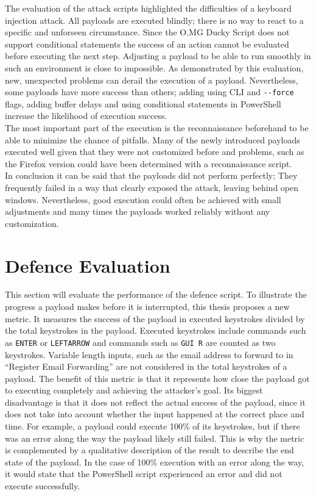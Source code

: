 The evaluation of the attack scripts highlighted the difficulties of a keyboard injection attack. All payloads are executed blindly; there is no way to react to a specific and unforseen circumstance. Since the O.MG Ducky Script does not support conditional statements the success of an action cannot be evaluated before executing the next step. Adjusting a payload to be able to run smoothly in such an environment is close to impossible. As demonstrated by this evaluation, new, unexpected problems can derail the execution of a payload. Nevertheless, some payloads have more success than others; adding using CLI and \verb|--force| flags, adding buffer delays and using conditional statements in PowerShell increase the likelihood of execution success. \\
The most important part of the execution is the reconnaissance beforehand to be able to minimize the chance of pitfalls. Many of the newly introduced payloads executed well given that they were not customized before and problems, such as the Firefox version could have been determined with a reconnaissance script. \\
In conclusion it can be said that the payloads did not perform perfectly; They frequently failed in a way that clearly exposed the attack, leaving behind open windows. Nevertheless, good execution could often be achieved with small adjustments and many times the payloads worked reliably without any customization. 




\section{Defence Evaluation} \label{defence evaluation}


This section will evaluate the performance of the defence script. To illustrate the progress a payload makes before it is interrupted, this thesis proposes a new metric. It measures the success of the payload in executed keystrokes divided by the total keystrokes in the payload. Executed keystrokes include commands such as \verb|ENTER| or \verb|LEFTARROW| and commands such as \verb|GUI R| are counted as two keystrokes. Variable length inputs, such as the email address to forward to in ``Register Email Forwarding'' are not considered in the total keystrokes of a payload. The benefit of this metric is that it represents how close the payload got to executing completely and achieving the attacker's goal. Its biggest disadvantage is that it does not reflect the actual success of the payload, since it does not take into account whether the input happened at the correct place and time. For example, a payload could execute 100\% of its keystrokes, but if there was an error along the way the payload likely still failed. This is why the metric is complemented by a qualitative description of the result to describe the end state of the payload. In the case of 100\% execution with an error along the way, it would state that the PowerShell script experienced an error and did not execute successfully. 

